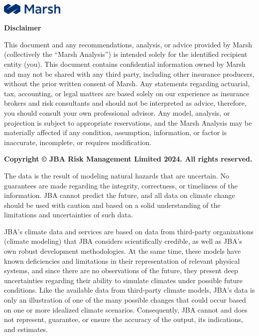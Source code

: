 \documentclass[
]{article}
\begin{document}
\newpage

\newpage

\noindent \includegraphics[width=3cm]{Logo.png}

\vspace{1cm}

\noindent \textbf{\textcolor{azuloscuro}{\fontsize{28}{32}\selectfont Disclaimer}}
\vspace{1cm}

\fontsize{11}{13}\selectfont This document and any recommendations,
analysis, or advice provided by Marsh (collectively the ``Marsh
Analysis'') is intended solely for the identified recipient entity
(you). This document contains confidential information owned by Marsh
and may not be shared with any third party, including other insurance
producers, without the prior written consent of Marsh. Any statements
regarding actuarial, tax, accounting, or legal matters are based solely
on our experience as insurance brokers and risk consultants and should
not be interpreted as advice, therefore, you should consult your own
professional advisor. Any model, analysis, or projection is subject to
appropriate reservations, and the Marsh Analysis may be materially
affected if any condition, assumption, information, or factor is
inaccurate, incomplete, or requires modification.

\textbf{\fontsize{11}{13}\selectfont Copyright © JBA Risk Management Limited 2024. All rights reserved.}

\fontsize{11}{13}\selectfont The data is the result of modeling natural
hazards that are uncertain. No guarantees are made regarding the
integrity, correctness, or timeliness of the information. JBA cannot
predict the future, and all data on climate change should be used with
caution and based on a solid understanding of the limitations and
uncertainties of such data.

\fontsize{11}{13}\selectfont JBA's climate data and services are based
on data from third-party organizations (climate modeling) that JBA
considers scientifically credible, as well as JBA's own robust
development methodologies. At the same time, these models have known
deficiencies and limitations in their representation of relevant
physical systems, and since there are no observations of the future,
they present deep uncertainties regarding their ability to simulate
climates under possible future conditions. Like the available data from
third-party climate models, JBA's data is only an illustration of one of
the many possible changes that could occur based on one or more
idealized climate scenarios. Consequently, JBA cannot and does not
represent, guarantee, or ensure the accuracy of the output, its
indications, and estimates.
\end{document}
